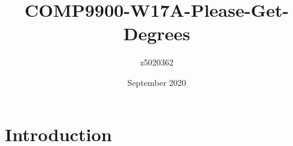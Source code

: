 \documentclass{article}
\title{COMP9900-W17A-Please-Get-Degrees}
\author{z5020362 }
\date{September 2020}
\begin{document}
\maketitle

\section{Introduction}
\end{document}
